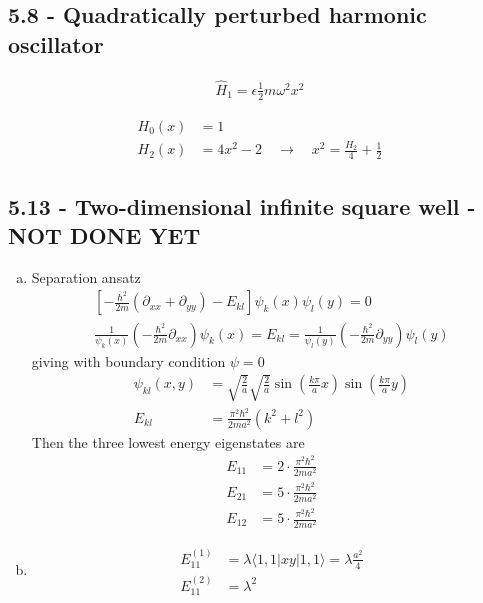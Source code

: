 \documentclass[../main.tex]{subfiles}
\begin{document}
\subsection{5.8 - Quadratically perturbed harmonic oscillator}
\begin{align}
\hat{H}_1=\epsilon\frac{1}{2}m\omega^2x^2
\end{align}

\begin{align}
H_0(x)&=1\\
H_2(x)&=4x^2-2\quad\rightarrow\quad x^2=\frac{H_2}{4}+\frac{1}{2}
\end{align}

\subsection{5.13 - Two-dimensional infinite square well - NOT DONE YET}\begin{enumerate}[a.]
\item  Separation ansatz
\begin{align}
\left[-\frac{\hbar^2}{2m}(\partial_{xx}+\partial_{yy})-E_{kl}\right]\psi_k(x)\psi_l(y)=0\\
\frac{1}{\psi_k(x)}\left(-\frac{\hbar^2}{2m}\partial_{xx}\right)\psi_k(x)=E_{kl}=\frac{1}{\psi_l(y)}\left(-\frac{\hbar^2}{2m}\partial_{yy}\right)\psi_l(y)
\end{align}
giving with boundary condition $\psi=0$
\begin{align}
\psi_{kl}(x,y)&=\sqrt{\frac{2}{a}}\sqrt{\frac{2}{a}}\sin(\frac{k\pi}{a}x)\sin(\frac{k\pi}{a}y)\\
E_{kl}&=\frac{\pi^2\hbar^2}{2ma^2}(k^2+l^2)
\end{align}
Then the three lowest energy eigenstates are
\begin{align}
E_{11}&=2\cdot\frac{\pi^2\hbar^2}{2ma^2}\\
E_{21}&=5\cdot\frac{\pi^2\hbar^2}{2ma^2}\\
E_{12}&=5\cdot\frac{\pi^2\hbar^2}{2ma^2}
\end{align}
\item
\begin{align}
E_{11}^{(1)}
&=\lambda\langle 1,1|xy|1,1\rangle=\lambda \frac{a^2}{4}\\
E_{11}^{(2)}
&=\lambda^2
\end{align}
\end{enumerate}
\end{document}
